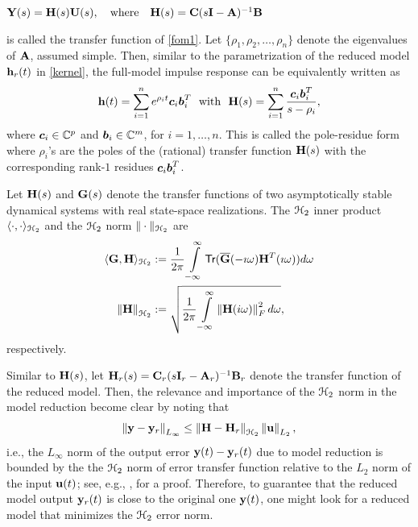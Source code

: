 \documentclass[twocolumn]{autart}
\begin{document}
$\mathbf{Y}(s)= \mathbf{H}(s) \mathbf{U}(s),  \quad \mbox{where} \quad \mathbf{H}(s) =\mathbf{C}(s\mathbf{I}-\mathbf{A})^{-1}\mathbf{B}$

is called the transfer function of \eqref{fom1}. Let $\{\rho_1,\rho_2,\ldots,\rho_n\}$ denote the eigenvalues of $\mathbf{A}$, assumed simple. Then, similar to the parametrization of the reduced model $\mathbf{h}_r(t)$ in \eqref{kernel}, the full-model impulse response can be equivalently written as 
\begin{equation} \label{eqn:hfull}
\mathbf{h}(t) = \sum_{i=1}^n e^{\rho_i t} \boldsymbol{c}_i \boldsymbol{b}_i^T~~\mbox{with}~~
\mathbf{H}(s) =\sum_{i=1}^n \frac{\boldsymbol{c}_i \boldsymbol{b}_i^T}{s-\rho_i},
\end{equation}
where $\boldsymbol{c}_i \in \mathbb{C}^{p}$ and $\boldsymbol{b}_i \in \mathbb{C}^m$, for $i=1,\ldots,n$.
This is called the pole-residue form where $\rho_i$'s are the poles of the (rational) transfer  function 
$\mathbf{H}(s)$ with the corresponding rank-$1$ residues $\boldsymbol{c}_i \boldsymbol{b}_i^T$.
\begin{Definition}
Let $\mathbf{H}(s)$ and $\mathbf{G}(s)$ denote the transfer functions  of two asymptotically stable  dynamical systems with real state-space realizations.
The $\EuScript{H}_2$ inner product $\langle \cdot, \cdot \rangle_{\EuScript{H}_2}$ 
and the $\EuScript{H}_2$ norm $\| \cdot \|_{\EuScript{H}_2}$ are
\begin{align*}
\langle \G, \HH \rangle_{\ch_2}&:=\dfrac{1}{2\pi}\int_{-\infty}^\infty \mathsf{Tr}(\overline{\G}(-\imath\omega)\HH^T(\imath\omega)) d\omega \\
\norm{ \HH}_{\ch_2}&:=\sqrt{\dfrac{1}{2\pi} \int_{-\infty}^\infty \norm{\HH(i\omega)}_F^2 d\omega},
\end{align*}
respectively.
\end{Definition}

Similar to $\mathbf{H}(s)$, let $\mathbf{H}_r(s)=\mathbf{C}_r(s\mathbf{I}_r-\mathbf{A}_r)^{-1}\mathbf{B}_r$ denote the transfer function of the reduced model. Then, the relevance and importance of the $\EuScript{H}_2$ norm in the model reduction become clear by noting that 
\begin{equation}
\begin{aligned}
\left\lVert\mathbf{y}-\mathbf{y}_r\right\rVert_{L_\infty}\leq\left\lVert\mathbf{H}-\mathbf{H}_r\right\rVert_{\EuScript{H}_2}\left\lVert\mathbf{u}\right\rVert_{L_2},
\end{aligned}
\end{equation}
i.e., the $L_\infty$ norm of the output error $\mathbf{y}(t)-\mathbf{y}_r(t)$ due to model reduction is bounded by the 
the $\EuScript{H}_2$ norm of error transfer function relative to the $L_2$ norm of the input $\mathbf{u}(t)$;
see, e.g.,  \cite{AntBG10b}, for a proof.
Therefore, to guarantee that the reduced model output $\mathbf{y}_r(t)$ is close to the original one $\mathbf{y}(t)$, one might look for a reduced model that minimizes the $\EuScript{H}_2$ error norm.
\end{document}
